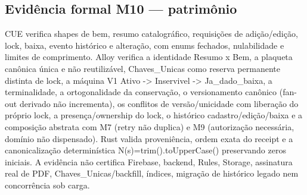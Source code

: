 \subsection*{Evidência formal M10 --- patrimônio}
CUE verifica shapes de bem, resumo catalográfico, requisições de adição/edição, lock, baixa, evento histórico e alteração, com enums fechados, nulabilidade e limites de comprimento. Alloy verifica a identidade Resumo x Bem, a plaqueta canônica única e não reutilizável, Chaves\_Unicas como reserva permanente distinta de lock, a máquina V1 Ativo -> Inservivel -> Ja\_dado\_baixa, a terminalidade, a ortogonalidade da conservação, o versionamento canônico (fan-out derivado não incrementa), os conflitos de versão/unicidade com liberação do próprio lock, a presença/ownership do lock, o histórico cadastro/edição/baixa e a composição abstrata com M7 (retry não duplica) e M9 (autorização necessária, domínio não dispensado). Rust valida proveniência, ordem exata do receipt e a canonicalização determinística N(s)=trim().toUpperCase() preservando zeros iniciais. A evidência não certifica Firebase, backend, Rules, Storage, assinatura real de PDF, Chaves\_Unicas/backfill, índices, migração de histórico legado nem concorrência sob carga.
